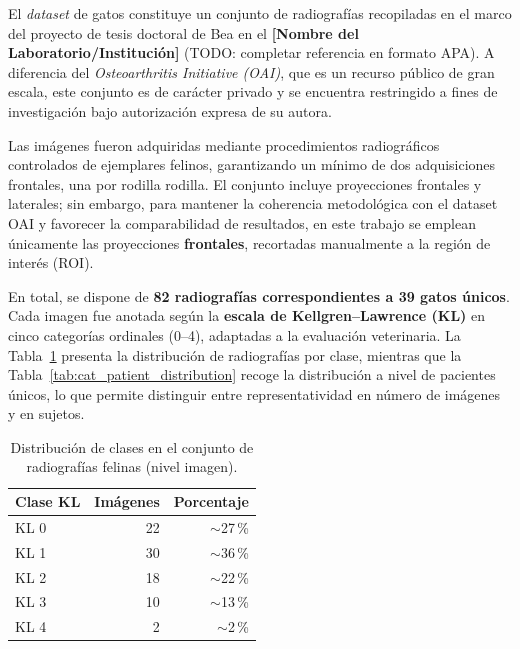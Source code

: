 \documentclass[11pt,spanish,listoffigures,listoftables]{tfgetsinf}
\begin{document}
El \emph{dataset} de gatos constituye un conjunto de radiografías recopiladas en el marco del proyecto de tesis doctoral de Bea en el \textbf{[Nombre del Laboratorio/Institución]} (TODO: completar referencia en formato APA). A diferencia del \emph{Osteoarthritis Initiative (OAI)}, que es un recurso público de gran escala, este conjunto es de carácter privado y se encuentra restringido a fines de investigación bajo autorización expresa de su autora.

Las imágenes fueron adquiridas mediante procedimientos radiográficos controlados de ejemplares felinos, garantizando un mínimo de dos adquisiciones frontales, una por rodilla rodilla. El conjunto incluye proyecciones frontales y laterales; sin embargo, para mantener la coherencia metodológica con el dataset OAI y favorecer la comparabilidad de resultados, en este trabajo se emplean únicamente las proyecciones \textbf{frontales}, recortadas manualmente a la región de interés (ROI).

En total, se dispone de \textbf{82 radiografías correspondientes a 39 gatos únicos}. Cada imagen fue anotada según la \textbf{escala de Kellgren--Lawrence (KL)} en cinco categorías ordinales (0--4), adaptadas a la evaluación veterinaria. La Tabla~\ref{tab:cat_class_distribution} presenta la distribución de radiografías por clase, mientras que la Tabla~\ref{tab:cat_patient_distribution} recoge la distribución a nivel de pacientes únicos, lo que permite distinguir entre representatividad en número de imágenes y en sujetos.

\begin{table}[H]
    \centering
    \caption{Distribución de clases en el conjunto de radiografías felinas (nivel imagen).}
    \label{tab:cat_class_distribution}
    \begin{tabular}{lrr}
        \toprule
        \textbf{Clase KL}  & \textbf{Imágenes} & \textbf{Porcentaje} \\
        \midrule
        KL 0  & 22 & $\sim$27\,\% \\
        KL 1  & 30 & $\sim$36\,\% \\
        KL 2  & 18 & $\sim$22\,\% \\
        KL 3  & 10 & $\sim$13\,\% \\
        KL 4  &  2 &  $\sim$2\,\% \\
        \bottomrule
    \end{tabular}
\end{table}
\end{document}
